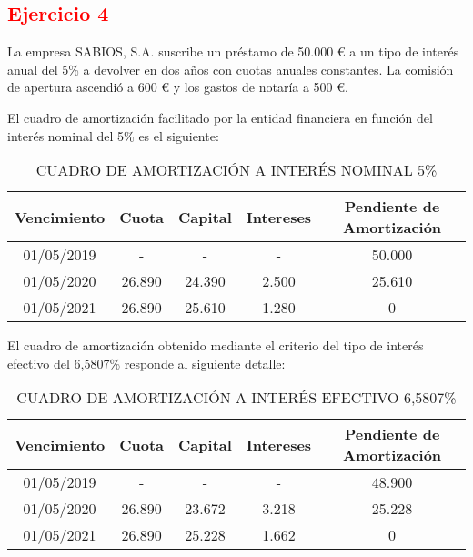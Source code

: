 \newpage
\subsection*{\textcolor{red}{Ejercicio 4}}

La empresa SABIOS, S.A. suscribe un préstamo de 50.000 € a un tipo de interés anual del 5\% a devolver en dos años con cuotas anuales constantes. La comisión de apertura ascendió a 600 € y los gastos de notaría a 500 €.

El cuadro de amortización facilitado por la entidad financiera en función del interés nominal del 5\% es el siguiente:

\begin{table}[H]
\centering
\begin{tabular}{|c|c|c|c|c|}
\hline
\textbf{Vencimiento} & \textbf{Cuota} & \textbf{Capital} & \textbf{Intereses} & \textbf{Pendiente de Amortización} \\ \hline
01/05/2019 & - & - & - & 50.000 \\ \hline
01/05/2020 & 26.890 & 24.390 & 2.500 & 25.610 \\ \hline
01/05/2021 & 26.890 & 25.610 & 1.280 & 0 \\ \hline
\end{tabular}
\caption{CUADRO DE AMORTIZACIÓN A INTERÉS NOMINAL 5\%}
\end{table}

El cuadro de amortización obtenido mediante el criterio del tipo de interés efectivo del 6,5807\% responde al siguiente detalle:

\begin{table}[h!]
\centering
\begin{tabular}{|c|c|c|c|c|}
\hline
\textbf{Vencimiento} & \textbf{Cuota} & \textbf{Capital} & \textbf{Intereses} & \textbf{Pendiente de Amortización} \\ \hline
01/05/2019 & - & - & - & 48.900 \\ \hline
01/05/2020 & 26.890 & 23.672 & 3.218 & 25.228 \\ \hline
01/05/2021 & 26.890 & 25.228 & 1.662 & 0 \\ \hline
\end{tabular}
\caption{CUADRO DE AMORTIZACIÓN A INTERÉS EFECTIVO 6,5807\%}
\end{table}

